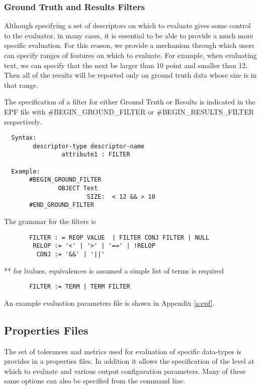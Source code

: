 \subsubsection{Ground Truth and Results Filters}

Although specifying a set of descriptors on which to evaluate gives
some control to the evaluator, in many cases, it is essential to be
able to provide a much more specific evaluation.  For this reason, we
provide a mechanism through which users can specify ranges of features
on which to evaluate.  For example, when evaluating text, we can
specify that the next be larger than 10 point and smaller than 12.
Then all of the results will be reported only on ground truth data
whose size is in that range.


The specification of a filter for either Ground Truth or Results is
indicated in the EPF file with \#BEGIN\_GROUND\_FILTER or
\#BEGIN\_RESULTS\_FILTER respectively.
\begin{verbatim}
  Syntax:
        descriptor-type descriptor-name 
                attribute1 : FILTER

  Example:
       #BEGIN_GROUND_FILTER
               OBJECT Text
                       SIZE:  < 12 && > 10
       #END_GROUND_FILTER
\end{verbatim}

The grammar for the filters is 
       
\begin{verbatim}
       FILTER : = REOP VALUE  | FILTER CONJ FILTER | NULL 
        RELOP := '<' | '>' | '==' | !RELOP
         CONJ := '&&' | '||' 
\end{verbatim}

** for lvalues, equivalences is assumed a simple list of terms is required

\begin{verbatim}
       FILTER := TERM | TERM FILTER
\end{verbatim}


An example evaluation parameters file is shown in Appendix \ref{a:epf}.

\subsection{Properties Files}
The set of tolerances and metrics used for evaluation of specific
data-types is provides in a properties files.  In addition it allows the
specification of the level at which to evaluate and various output
configuration parameters.  Many of these same options can also be
specified from the command line.

